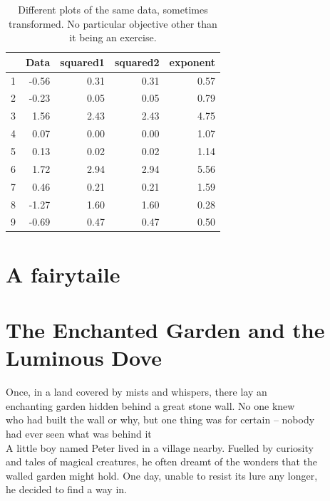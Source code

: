 \documentclass[12pt, a4paper, titlepage]{article}
\begin{document}
\vspace{0.5cm}


\begin{table}[H]
  \centering
  \caption{Different plots of the same data, sometimes transformed. No particular objective 
other than it being an exercise.}



\begin{tabular}{lrrrr}
  \hline
   & Data & squared1 & squared2 & exponent\\ 
  \hline
  1           & -0.56 & 0.31 & 0.31 & 0.57\\ 
  2           & -0.23 & 0.05 & 0.05 & 0.79\\ 
  3           & 1.56 & 2.43 & 2.43 & 4.75 \\ 
  4           & 0.07 & 0.00 & 0.00 & 1.07 \\ 
  5           & 0.13 & 0.02 & 0.02 & 1.14  \\ 
  6           & 1.72 & 2.94 & 2.94 & 5.56 \\ 
  7           & 0.46 & 0.21 & 0.21 & 1.59 \\ 
  8           & -1.27 & 1.60 & 1.60 & 0.28\\
  9           & -0.69 & 0.47 & 0.47 & 0.50\\ 
   \hline
  \end{tabular}
\end{table}




\section{A fairytaile}
\section*{The Enchanted Garden and the Luminous Dove}

Once, in a land covered by mists and whispers, there lay an\\ 
enchanting garden hidden behind a great stone wall. No one knew\\
who had built the wall or why, but one thing was for certain – nobody\\ 
had ever seen what was behind it\\


A little boy named Peter lived in a village nearby. Fuelled by curiosity\\
and tales of magical creatures, he often dreamt of the wonders that the\\ 
walled garden might hold. One day, unable to resist its lure any longer,\\
he decided to find a way in.\\
\end{document}
